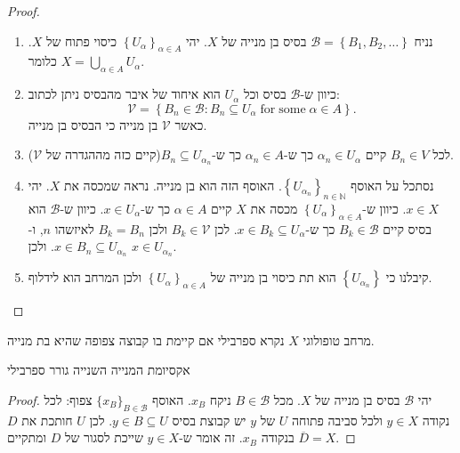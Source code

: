 \documentclass{tstextbook}
\begin{document}
\begin{proof}
  \begin{enumerate}
    \item נניח \(\mathcal{B}=\left\{  B_{1},B_{2},\dots  \right\}\) בסיס בן מנייה של \(X\). יהי \(\left\{  U_{\alpha}  \right\}_{\alpha \in A}\) כיסוי פתוח של \(X\). כלומר \(X = \bigcup_{\alpha \in A}U_{\alpha}\). 


    \item כיוון ש-\(\mathcal{B}\) בסיס וכל \(U_{\alpha}\) הוא איחוד של איבר מהבסיס ניתן לכתוב: 
$$\mathcal{V}=\left\{ B_{n}\in\mathcal{B}:B_{n}\subseteq U_{\alpha}\;\mathrm{for\;some}\;\alpha \in A \right\}.$$
כאשר \(\mathcal{V}\) בן מנייה כי הבסיס בן מנייה.


    \item לכל \(B_{n}\in V\) קיים \(\alpha_{n}\in U_{\alpha}\) כך ש-\(\alpha _n \in A\) כך ש-\(B_{n}\subseteq U_{\alpha_{n}}\)(קיים כזה מההגדרה של \(\mathcal{ V}\)). 


    \item נסתכל על האוסף \(\left\{  U_{\alpha_{n}}  \right\}_{n \in \mathbb{N}}\). האוסף הזה הוא בן מנייה. נראה שמכסה את \(X\). יהי \(x \in X\). כיוון ש-\(\left\{  U_{\alpha}  \right\}_{\alpha \in A}\) מכסה את \(X\) קיים \(\alpha \in A\) כך ש-\(x \in U_{\alpha}\). כיוון ש-\(\mathcal{B}\) הוא בסיס קיים \(B_{k}\in \mathcal{B}\) כך ש-\(x \in B_{k}\subseteq U_{\alpha}\). לכן \(B_{k}\in \mathcal{V}\) ולכן \(B_{k}=B_{n}\) לאיזשהו \(n\), ו-\(x \in B_{n}\subseteq U_{\alpha_{n}}\). ולכן \(x \in U_{\alpha_{n}}\).  


    \item קיבלנו כי \(\left\{  U_{\alpha_{n}}  \right\}\) הוא תת כיסוי בן מנייה של \(\left\{  U_{\alpha}  \right\}_{\alpha \in A}\) ולכן המרחב הוא לידלוף. 


  \end{enumerate}
\end{proof}
\begin{definition}
מרחב טופולוגי \(X\) נקרא ספרבילי אם קיימת בו קבוצה צפופה שהיא בת מנייה.

\end{definition}
\begin{lemma}
אקסיומת המנייה השנייה גורר ספרבילי

\end{lemma}
\begin{proof}
יהי \(\mathcal{B}\) בסיס בן מנייה של \(X\). מכל \(B \in \mathcal{B}\) ניקח \(x_{B}\). האוסף \(\{ x_{B} \}_{B \in \mathcal{B}}\) צפוף: לכל נקודה \(y \in X\) ולכל סביבה פתוחה \(U\) של \(y\) יש קבוצת בסיס \(y \in B \subseteq U\). לכן \(U\) חותכת את \(D\) בנקודה \(x_{B}\). זה אומר ש-\(y\in X\) שייכת לסגור של \(D\) ומתקיים \(\overline{D}=X\).

\end{proof}
\end{document}
